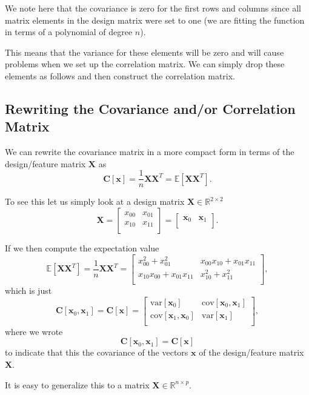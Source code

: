 \documentclass[%
oneside,                 %
final,                   %
10pt]{article}
\begin{document}
We note here that the covariance is zero for the first rows and
columns since all matrix elements in the design matrix were set to one
(we are fitting the function in terms of a polynomial of degree $n$).

This means that the variance for these elements will be zero and will
cause problems when we set up the correlation matrix.  We can simply
drop these elements as follows and then construct the correlation
matrix. 


\subsection{Rewriting the Covariance and/or Correlation Matrix}

We can rewrite the covariance matrix in a more compact form in terms of the design/feature matrix $\bm{X}$ as 
\[
\bm{C}[\bm{x}] = \frac{1}{n}\bm{X}\bm{X}^T= \mathbb{E}[\bm{X}\bm{X}^T].
\]

To see this let us simply look at a design matrix $\bm{X}\in {\mathbb{R}}^{2\times 2}$
\[
\bm{X}=\begin{bmatrix}
x_{00} & x_{01}\\
x_{10} & x_{11}\\
\end{bmatrix}=\begin{bmatrix}
\bm{x}_{0} & \bm{x}_{1}\\
\end{bmatrix}.
\]

If we then compute the expectation value
\[
\mathbb{E}[\bm{X}\bm{X}^T] = \frac{1}{n}\bm{X}\bm{X}^T=\begin{bmatrix}
x_{00}^2+x_{01}^2 & x_{00}x_{10}+x_{01}x_{11}\\
x_{10}x_{00}+x_{01}x_{11} & x_{10}^2+x_{11}^2\\
\end{bmatrix},
\]
which is just 
\[
\bm{C}[\bm{x}_0,\bm{x}_1] = \bm{C}[\bm{x}]=\begin{bmatrix} \mathrm{var}[\bm{x}_0] & \mathrm{cov}[\bm{x}_0,\bm{x}_1] \\
                              \mathrm{cov}[\bm{x}_1,\bm{x}_0] & \mathrm{var}[\bm{x}_1] \\
             \end{bmatrix},
\]
where we wrote $$\bm{C}[\bm{x}_0,\bm{x}_1] = \bm{C}[\bm{x}]$$ to indicate that this the covariance of the vectors $\bm{x}$ of the design/feature matrix $\bm{X}$.

It is easy to generalize this to a matrix $\bm{X}\in {\mathbb{R}}^{n\times p}$.
\end{document}
